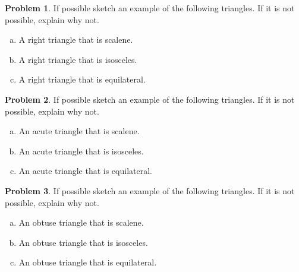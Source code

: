 \documentclass[12pt, reqno]{amsart}
\theoremstyle{remark}
\theoremstyle{definition}
\newtheorem{problem}{Problem}
\numberwithin{equation}{section}  %
\begin{document}
\begin{problem}
If possible sketch an example of the following triangles.  If it is not possible, explain why not.

\begin{enumerate}[(a)]
\item
A right triangle that is scalene.\\

\item
A right triangle that is isosceles.\\

\item
A right triangle that is equilateral.
\end{enumerate}
\end{problem}



\bigskip


\begin{problem}
If possible sketch an example of the following triangles.  If it is not possible, explain why not.

\begin{enumerate}[(a)]
\item
An acute triangle that is scalene.\\

\item
An acute triangle that is isosceles.\\

\item
An acute triangle that is equilateral.
\end{enumerate}
\end{problem}


\bigskip


\begin{problem}
If possible sketch an example of the following triangles.  If it is not possible, explain why not.

\begin{enumerate}[(a)]
\item
An obtuse triangle that is scalene.\\

\item
An obtuse triangle that is isosceles.\\

\item
An obtuse triangle that is equilateral.
\end{enumerate}
\end{problem}
\end{document}
